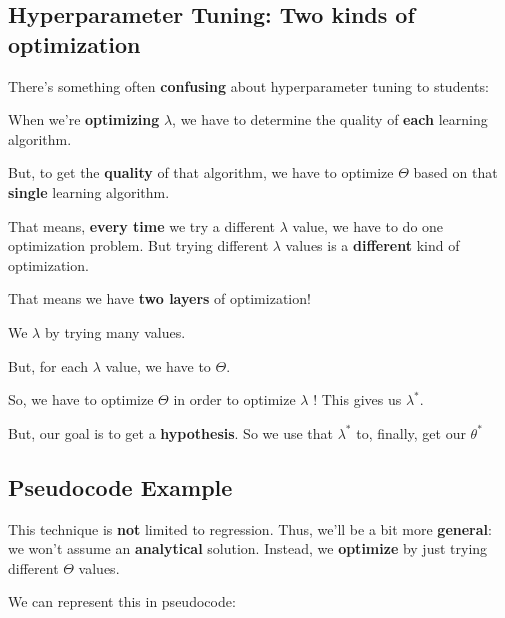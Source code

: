     \subsection*{Hyperparameter Tuning: Two kinds of optimization}
    
        There's something often \textbf{confusing} about hyperparameter tuning to students:
        
        When we're \textbf{optimizing} $\lambda$, we have to determine the quality of \textbf{each} learning algorithm.
        
        But, to get the \textbf{quality} of that algorithm, we have to optimize $\Theta$ based on that \textbf{single} learning algorithm.
        
        That means, \textbf{every time} we try a different $\lambda$ value, we have to do one optimization problem. But trying different $\lambda$ values is a \textbf{different} kind of optimization.
        
        That means we have \textbf{two layers} of optimization!\\
        
        \begin{clarification}
            We  $\lambda$ by trying many values.
            
            But, for each $\lambda$ value, we have to  $\Theta$.
            
            So, we have to optimize $\Theta$  in order to optimize $\lambda$ ! This gives us $\lambda^*.$
        \end{clarification}
        
        But, our goal is to get a \textbf{hypothesis}. So we use that $\lambda^*$ to, finally, get our $\theta^*$
        
    \subsection*{Pseudocode Example}
        
        This technique is \textbf{not} limited to regression. Thus, we'll be a bit more \textbf{general}: we won't assume an \textbf{analytical} solution. Instead, we \textbf{optimize} by just trying different $\Theta$ values.
        
        We can represent this in pseudocode:
        
